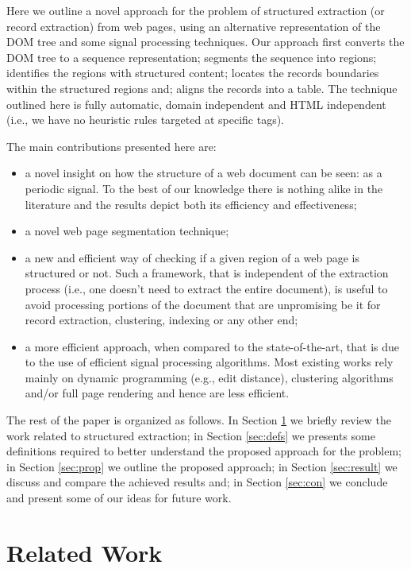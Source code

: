 \documentclass{vldb}
\begin{document}
Here we outline a novel approach for the problem of structured extraction (or
record extraction) from web pages, using an alternative representation of the
DOM tree and some signal processing techniques. Our approach first converts the
DOM tree to a sequence representation; segments the sequence into regions;
identifies the regions with structured content; locates the records boundaries
within the structured regions and; aligns the records into a table. The
technique outlined here is fully automatic, domain independent and HTML
independent (i.e., we have no heuristic rules targeted at specific tags).

The main contributions presented here are:
\begin{itemize}
    \item a novel insight on how the structure of a web document can be seen: as
    a periodic signal. To the best of our knowledge there is nothing alike in
    the literature and the results depict both its efficiency and effectiveness;
    \item a novel web page segmentation technique;
    \item a new and efficient way of checking if a given region of a web page is
    structured or not. Such a framework, that is independent of the extraction
    process (i.e., one doesn't need to extract the entire document), is useful
    to avoid processing portions of the document that are unpromising be it for
    record extraction, clustering, indexing or any other end;
    \item a more efficient approach, when compared to the state-of-the-art,
    that is due to the use of efficient signal processing algorithms. Most
    existing works rely mainly on dynamic programming (e.g., edit distance), clustering
    algorithms and/or full page rendering and hence are less efficient.
\end{itemize}

The rest of the paper is organized as follows. In Section \ref{sec:work} we
briefly review the work related to structured extraction; in Section
\ref{sec:defs} we presents some definitions required to better understand the
proposed approach for the problem; in Section \ref{sec:prop} we outline the
proposed approach; in Section \ref{sec:result} we discuss and compare the
achieved results and; in Section \ref{sec:con} we conclude and present some
of our ideas for future work.

\section{Related Work}\label{sec:work}
\end{document}

